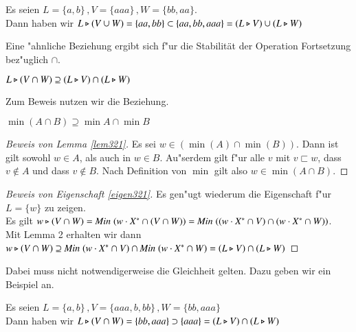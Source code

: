 \vspace{2ex}

\begin{beispiel}
Es seien $L= \{a,b\}\, ,V =\{aaa\}\, ,W = \{bb,aa\}$. \\Dann haben wir $L\triangleright (V\cup W)=\{aa,bb\} \subset \{aa,bb,aaa\} = (L\triangleright V) \cup (L\triangleright W)$
\end{beispiel}

Eine "ahnliche Beziehung ergibt sich f"ur die Stabilität der Operation Fortsetzung bez"uglich $\cap$.

\vspace{2ex}

\begin{eigen}\label{eigen321}
$L\triangleright (V\cap W)\supseteq (L\triangleright V) \cap (L\triangleright W)$
\end{eigen}
Zum Beweis nutzen wir die Beziehung.

\vspace{2ex}

\begin{lem}\label{lem321}
$\min(A\cap B) \supseteq \min A \cap \min B$
\end{lem}

\begin{proof}[Beweis von Lemma \ref{lem321}]
Es sei $w\in (\min(A) \cap \min(B))$. Dann ist gilt sowohl $w\in A$, als auch in $w\in B$. Au"serdem gilt f"ur alle $v$ mit $v\sqsubset w$, dass $v \notin A$ und dass $v \notin B$. Nach Definition von $\min$ gilt also $w\in \min(A\cap B)$.\emph{}
\end{proof}
\begin{proof}[Beweis von Eigenschaft \ref{eigen321}]
Es gen"ugt wiederum die Eigenschaft f"ur $L=\{w\}$ zu zeigen.\\
Es gilt $w\triangleright (V\cap W) = \mathit{Min}\;(w\cdot X^* \cap (V \cap W))= \mathit{Min}\;((w\cdot X^* \cap V) \cap (w\cdot X^* \cap W))$.\\
Mit Lemma 2 erhalten wir dann\\
$ w\triangleright (V\cap W) \supseteq \mathit{Min}\;(w\cdot X^* \cap V) \cap \mathit{Min}\;(w\cdot X^* \cap W)=(L\triangleright V) \cap (L\triangleright W)$
\end{proof}
Dabei muss nicht notwendigerweise die Gleichheit gelten. Dazu geben wir ein Beispiel an.

\vspace{2ex}

\begin{beispiel}
Es seien $L= \{a,b\}\, ,V =\{aaa,b,bb\}\, ,W = \{bb,aaa\}$\\
Dann haben wir $L\triangleright (V\cap W) = \{bb,aaa\} \supset \{ aaa \} =(L\triangleright V) \cap (L\triangleright W)$
\end{beispiel}

